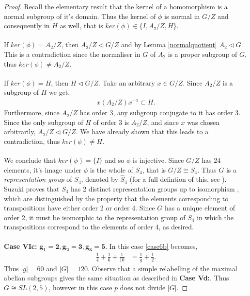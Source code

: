 \begin{proof}
Recall the elementary result that the kernel of a homomorphism is a normal subgroup of it's domain. Thus the kernel of $\phi$ is normal in $G / Z$ and consequently in $H$ as well, that is $ker(\phi) \in\{ I , A_2 / Z, H \}$. \\
\\
If $ker(\phi) = A_2 / Z$, then $A_2 / Z \vartriangleleft G / Z$ and by Lemma \ref{normalquotient} $A_2 \vartriangleleft G$. This is a contradiction since the normaliser in $G$ of $A_2$ is a proper subgroup of $G$, thus $ker(\phi) \neq A_2 / Z$. \\
\\
If $ker(\phi) = H$, then $H \vartriangleleft G / Z$. Take an arbitrary $x \in G / Z$. Since $A_2 / Z$ is a subgroup of $H$ we get,
\begin{align*} x (A_2 / Z) x^{-1} \subset H.
\end{align*}
Furthermore, since $A_2 / Z$ has order 3, any subgroup conjugate to it has order 3. Since the only subgroup of $H$ of order 3 is $A_2 / Z$, and since $x$ was chosen arbitrarily, $A_2 / Z \vartriangleleft G / Z$. We have already shown that this leads to a contradiction, thus $ker(\phi) \neq H$. \\
\\
We conclude that $ker(\phi) = \{ I \}$ and so $\phi$ is injective. Since $G / Z$ has 24 elements, it's image under $\phi$ is the whole of $S_4$, that is $G / Z \cong S_4$. Thus $G$ is a \textit{representation group} of $S_4$, denoted by $\widehat{S}_4$ (for a full defintion of this, see \cite{suzuki}). Suzuki proves that $S_4$ has 2 distinct representation groups up to isomorphism \cite[p.301]{suzuki}, which are distinguished by the property that the elements corresponding to transpositions have either order 2 or order 4. Since $G$ has a unique element of order 2, it must be isomorphic to the representation group of $S_4$ in which the transpositions correspond to the elements of order 4, as desired.\\
\\
 \space \textbf{Case VIc:} $\pmb{g_1 = 2, g_2 = 3, g_3 = 5}$.  In this case \eqref{case6b} becomes,
\begin{align*} \frac{1}{4} + \frac{1}{6} + \frac{1}{10} &= \frac{1}{g} + \frac{1}{2}.
\end{align*}
Thus $|g| = 60$ and $|G| = 120$. Observe that a simple relabelling of the maximal abelian subgroups gives the same situation as described in \textbf{Case Vd:}. Thus $G \cong SL(2,5)$, however in this case $p$ does not divide $|G|$.

\end{proof}

